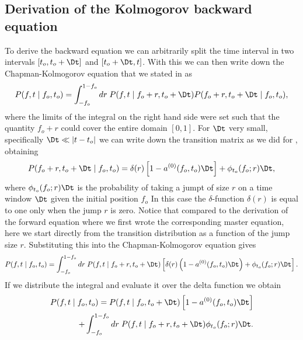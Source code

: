 \subsection{Derivation of the Kolmogorov backward equation}

To derive the backward equation we can arbitrarily split the time interval in
two intervals $[t_o, t_o + \Dt]$ and $[t_o + \Dt, t]$. With this we can then
write down the Chapman-Kolmogorov equation that we stated in
 as
\begin{equation}
  P(f, t \mid f_o, t_o) = \int_{-f_o}^{1 - f_o} dr \;
  P(f, t \mid f_o + r, t_o + \Dt)
  P(f_o + r, t_o + \Dt \mid f_o, t_o),
\end{equation}
where the limits of the integral on the right hand side were set such that the
quantity $f_o + r$ could cover the entire domain $[0, 1]$. For $\Dt$ very
small, specifically $\Dt \ll |t - t_o|$ we can write down the transition matrix
as we did for , obtaining
\begin{equation}
	P(f_o + r, t_o + \Dt \mid f_o, t_o) =
	\delta(r) \left[
	1 - a^{(0)}(f_o, t_o) \Dt
	\right] +
	\phi_{t_o}(f_o; r) \Dt,
\end{equation}
where $\phi_{t_o}(f_o; r) \Dt$ is the probability of taking a jumpt of size $r$
on a time window $\Dt$ given the initial position $f_o$ In this case the
$\delta$-function $\delta(r)$ is equal to one only when the jump $r$ is zero.
Notice that compared to the derivation of the forward equation where we first
wrote the corresponding master equation, here we start directly from the
transition distribution as a function of the jump size $r$. Substituting this
into the Chapman-Kolmogorov equation gives
\begin{equation}
	P(f, t \mid f_o, t_o) = \int_{-f_o}^{1 - f_o} dr\;
	P(f, t \mid f_o + r, t_o + \Dt)
	\left[
	\delta(r) \left( 1 - a^{(0)}(f_o, t_o) \Dt \right) +
	\phi_{t_o}(f_o; r) \Dt
	\right].
\end{equation}
If we distribute the integral and evaluate it over the delta function we obtain
\begin{equation}
	\begin{split}
		P(f, t \mid f_o, t_o) = P(f, t \mid f_o, t_o + \Dt)
		\left[
		1 - a^{(0)}(f_o, t_o)\Dt
		\right]\\ +
		\int_{-f_o}^{1 - f_o} dr\; P(f, t \mid f_o + r, t_o + \Dt)
		\phi_{t_o}(f_o; r) \Dt.
	\end{split}
	\label{eq_chap_kol_delta_eval_backwards}
\end{equation}
